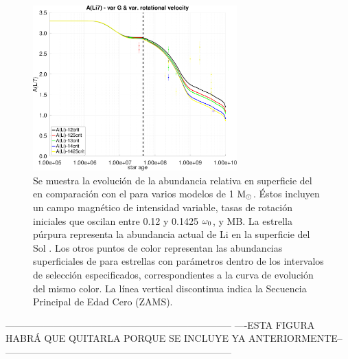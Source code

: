 \begin{figure}
	\centering
	\includegraphics[width=0.7\textwidth]{img/paper2/li_var_vel_var_g_3.pdf}
	\caption{Se muestra la evolución de la abundancia relativa en superficie del  en comparación con el  para varios modelos de 1 $\mathrm{M}_\odot$. Éstos incluyen un campo magnético de intensidad variable, tasas de rotación iniciales que oscilan entre 0.12 y 0.1425 $\omega_{\mathrm{0}}$, y MB. La estrella púrpura representa la abundancia actual de Li en la superficie del Sol \cite{Asplund2009}. Los otros puntos de color representan las abundancias superficiales de  para estrellas con parámetros dentro de los intervalos de selección especificados, correspondientes a la curva de evolución del mismo color. La línea vertical discontinua indica la Secuencia Principal de Edad Cero (ZAMS).}
	\label{fig:li_var_vel_var_g_3}
\end{figure}

-----------------------------------------------------------------------
----ESTA FIGURA HABRÁ QUE QUITARLA PORQUE SE INCLUYE YA ANTERIORMENTE--
-----------------------------------------------------------------------


